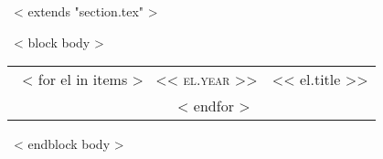 ~< extends "section.tex" >~

~< block body >~

\begin{tabular}{rp{11cm}}
    ~< for el in items >~
        \textsc{<< el.year >>} & << el.title >>\\
    ~< endfor >~
\end{tabular}

~< endblock body >~
